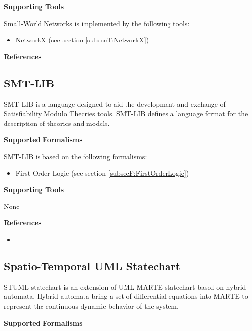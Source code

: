\textbf{Supporting Tools}

Small-World Networks is implemented by the following tools:
\begin{itemize}
	\item NetworkX (see section \ref{subsecT:NetworkX})
\end{itemize}


\textbf{References}




\subsection{SMT-LIB}
\label{subsecL:SMTLIBLanguage}


SMT-LIB is a language designed to aid the development and exchange of Satisfiability Modulo Theories tools. SMT-LIB defines a language format for the description of theories and models.

\textbf{Supported Formalisms}

SMT-LIB is based on the following formalisms:
\begin{itemize}
	\item First Order Logic (see section \ref{subsecF:FirstOrderLogic})
\end{itemize}


\textbf{Supporting Tools}

None


\textbf{References}
\begin{itemize}
	
\item {}
\end{itemize}



\subsection{Spatio-Temporal UML Statechart}
\label{subsecL:STUML}


STUML statechart is an extension of UML MARTE statechart based on hybrid automata. Hybrid automata bring a set of differential equations into MARTE to represent the continuous dynamic behavior of the system.

\textbf{Supported Formalisms}

